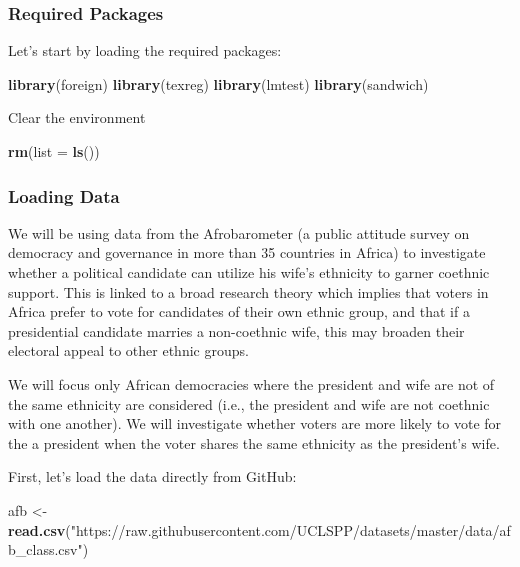 \documentclass[]{article}
\newenvironment{Shaded}{\begin{snugshade}}{\end{snugshade}}
\newcommand{\KeywordTok}[1]{\textcolor[rgb]{0.13,0.29,0.53}{\textbf{#1}}}
\newcommand{\DataTypeTok}[1]{\textcolor[rgb]{0.13,0.29,0.53}{#1}}
\newcommand{\StringTok}[1]{\textcolor[rgb]{0.31,0.60,0.02}{#1}}
\newcommand{\NormalTok}[1]{#1}
\theoremstyle{definition}
\theoremstyle{definition}
\theoremstyle{definition}
\theoremstyle{remark}
\begin{document}
\subsubsection{Required Packages}\label{required-packages-1}

Let's start by loading the required packages:

\begin{Shaded}
\begin{Highlighting}[]
\KeywordTok{library}\NormalTok{(foreign) }
\KeywordTok{library}\NormalTok{(texreg) }
\KeywordTok{library}\NormalTok{(lmtest)}
\KeywordTok{library}\NormalTok{(sandwich)}
\end{Highlighting}
\end{Shaded}

Clear the environment

\begin{Shaded}
\begin{Highlighting}[]
\KeywordTok{rm}\NormalTok{(}\DataTypeTok{list =} \KeywordTok{ls}\NormalTok{())}
\end{Highlighting}
\end{Shaded}

\subsubsection{Loading Data}\label{loading-data-2}

We will be using data from the Afrobarometer (a public attitude survey
on democracy and governance in more than 35 countries in Africa) to
investigate whether a political candidate can utilize his wife's
ethnicity to garner coethnic support. This is linked to a broad research
theory which implies that voters in Africa prefer to vote for candidates
of their own ethnic group, and that if a presidential candidate marries
a non-coethnic wife, this may broaden their electoral appeal to other
ethnic groups.

We will focus only African democracies where the president and wife are
not of the same ethnicity are considered (i.e., the president and wife
are not coethnic with one another). We will investigate whether voters
are more likely to vote for the a president when the voter shares the
same ethnicity as the president's wife.

First, let's load the data directly from GitHub:

\begin{Shaded}
\begin{Highlighting}[]
\NormalTok{afb <-}\StringTok{ }\KeywordTok{read.csv}\NormalTok{(}\StringTok{"https://raw.githubusercontent.com/UCLSPP/datasets/master/data/afb_class.csv"}\NormalTok{)}
\end{Highlighting}
\end{Shaded}
\end{document}
